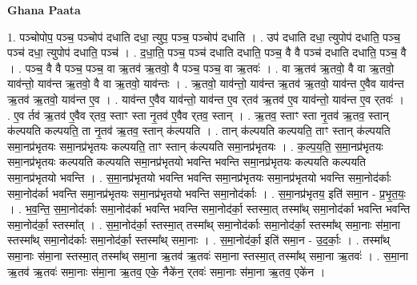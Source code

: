 \documentclass[17pt]{extarticle}
\begin{document}
\textbf{Ghana Paata } \newline

1. पञ्चोपोप॒ पञ्च॒ पञ्चोप॑ दधाति दधा॒ त्युप॒ पञ्च॒ पञ्चोप॑ दधाति । . उप॑ दधाति दधा॒ त्युपोप॑ दधाति॒ पञ्च॒ पञ्च॑ दधा॒ त्युपोप॑ दधाति॒ पञ्च॑ । . द॒धा॒ति॒ पञ्च॒ पञ्च॑ दधाति दधाति॒ पञ्च॒ वै वै पञ्च॑ दधाति दधाति॒ पञ्च॒ वै । . पञ्च॒ वै वै पञ्च॒ पञ्च॒ वा ऋ॒तव॑ ऋ॒तवो॒ वै पञ्च॒ पञ्च॒ वा ऋ॒तवः॑ । . वा ऋ॒तव॑ ऋ॒तवो॒ वै वा ऋ॒तवो॒ याव॑न्तो॒ याव॑न्त ऋ॒तवो॒ वै वा ऋ॒तवो॒ याव॑न्तः । . ऋ॒तवो॒ याव॑न्तो॒ याव॑न्त ऋ॒तव॑ ऋ॒तवो॒ याव॑न्त ए॒वैव याव॑न्त ऋ॒तव॑ ऋ॒तवो॒ याव॑न्त ए॒व । . याव॑न्त ए॒वैव याव॑न्तो॒ याव॑न्त ए॒व र्‌तव॑ ऋ॒तव॑ ए॒व याव॑न्तो॒ याव॑न्त ए॒व र्‌तवः॑ । . ए॒व र्तव॑ ऋ॒तव॑ ए॒वैव र्‌तव॒ स्ताꣳ स्ता नृ॒तव॑ ए॒वैव र्‌तव॒ स्तान् । . ऋ॒तव॒ स्ताꣳ स्ता नृ॒तव॑ ऋ॒तव॒ स्तान् क॑ल्पयति कल्पयति॒ ता नृ॒तव॑ ऋ॒तव॒ स्तान् क॑ल्पयति । . तान् क॑ल्पयति कल्पयति॒ ताꣳ स्तान् क॑ल्पयति समा॒नप्र॑भृतयः समा॒नप्र॑भृतयः कल्पयति॒ ताꣳ स्तान् क॑ल्पयति समा॒नप्र॑भृतयः । . क॒ल्प॒य॒ति॒ स॒मा॒नप्र॑भृतयः समा॒नप्र॑भृतयः कल्पयति कल्पयति समा॒नप्र॑भृतयो भवन्ति भवन्ति समा॒नप्र॑भृतयः कल्पयति कल्पयति समा॒नप्र॑भृतयो भवन्ति । . स॒मा॒नप्र॑भृतयो भवन्ति भवन्ति समा॒नप्र॑भृतयः समा॒नप्र॑भृतयो भवन्ति समा॒नोद॑र्काः समा॒नोद॑र्का भवन्ति समा॒नप्र॑भृतयः समा॒नप्र॑भृतयो भवन्ति समा॒नोद॑र्काः । . स॒मा॒नप्र॑भृतय॒ इति॑ समा॒न - प्र॒भृ॒त॒यः॒ । . भ॒व॒न्ति॒ स॒मा॒नोद॑र्काः समा॒नोद॑र्का भवन्ति भवन्ति समा॒नोद॑र्का॒ स्तस्मा॒त् तस्मा᳚थ् समा॒नोद॑र्का भवन्ति भवन्ति समा॒नोद॑र्का॒ स्तस्मा᳚त् । . स॒मा॒नोद॑र्का॒ स्तस्मा॒त् तस्मा᳚थ् समा॒नोद॑र्काः समा॒नोद॑र्का॒ स्तस्मा᳚थ् समा॒नाः स॑मा॒ना स्तस्मा᳚थ् समा॒नोद॑र्काः समा॒नोद॑र्का॒ स्तस्मा᳚थ् समा॒नाः । . स॒मा॒नोद॑र्का॒ इति॑ समा॒न - उ॒द॒र्काः॒ । . तस्मा᳚थ् समा॒नाः स॑मा॒ना स्तस्मा॒त् तस्मा᳚थ् समा॒ना ऋ॒तव॑ ऋ॒तवः॑ समा॒ना स्तस्मा॒त् तस्मा᳚थ् समा॒ना ऋ॒तवः॑ । . स॒मा॒ना ऋ॒तव॑ ऋ॒तवः॑ समा॒नाः स॑मा॒ना ऋ॒तव॒ एके॒ नैके॑न॒ र्‌तवः॑ समा॒नाः स॑मा॒ना ऋ॒तव॒ एके॑न । \newline
\end{document}
